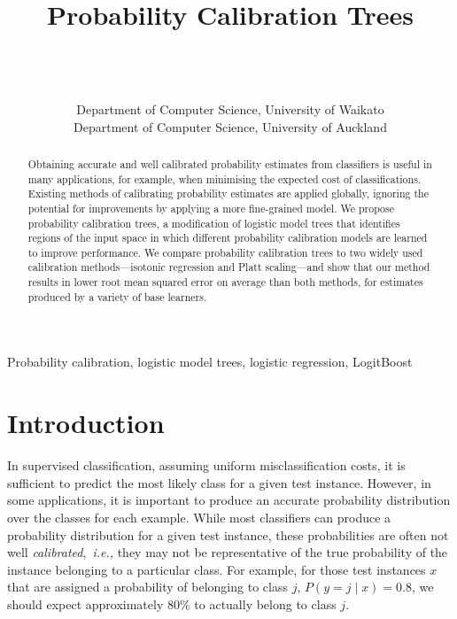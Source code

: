 \documentclass[wcp]{jmlr}
\title[Probability Calibration Trees]{Probability Calibration Trees}
\author{\Name{Tim Leathart} \Email{tml15@students.waikato.ac.nz}\\
   \Name{Eibe Frank} \Email{eibe@cs.waikato.ac.nz}\\
   \Name{Geoffrey Holmes} \Email{geoff@cs.waikato.ac.nz}\\
   \addr Department of Computer Science, University of Waikato
   \AND
   \Name{Bernhard Pfahringer} \Email{b.pfahringer@auckland.ac.nz}\\
   \addr Department of Computer Science, University of Auckland
}
\begin{document}
\maketitle

\begin{abstract}
Obtaining accurate and well calibrated probability estimates from classifiers is useful in many applications, for example, when minimising the expected cost of classifications. Existing methods of calibrating probability estimates are applied globally, ignoring the potential for improvements by applying a more fine-grained model. We propose probability calibration trees, a modification of logistic model trees that identifies regions of the input space in which different probability calibration models are learned to improve performance. We compare probability calibration trees to two widely used calibration methods---isotonic regression and Platt scaling---and show that our method results in lower root mean squared error on average than both methods, for estimates produced by a variety of base learners.

\end{abstract}
\begin{keywords}
Probability calibration, logistic model trees, logistic regression, LogitBoost
\end{keywords}

\section{Introduction}
In supervised classification, assuming uniform misclassification costs, it is sufficient to predict the most likely class for a given test instance. However, in some applications, it is important to produce an accurate probability distribution over the classes for each example. While most classifiers can produce a probability distribution for a given test instance, these probabilities are often not well \textit{calibrated},~\textit{i.e.,} they may not be representative of the true probability of the instance belonging to a particular class. For example, for those test instances $x$ that are assigned a probability of belonging to class $j$, $P(y=j \mid x) = 0.8$, we should expect approximately $80\%$ to actually belong to class $j$. 
\end{document}

